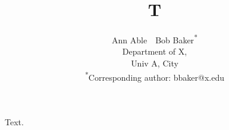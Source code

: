 \documentclass{article}
\title{T}
\author{Ann Able~~Bob Baker\textsuperscript{*} \\
\small Department of X,\\ \small Univ A, City\\
\small \textsuperscript{*}Corresponding author: bbaker@x.edu}
\begin{document}
\maketitle
Text.
\end{document}
